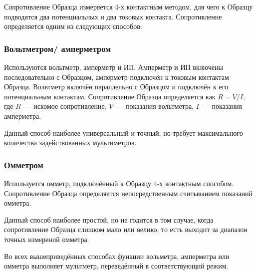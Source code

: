 \label{sec_r_measures}

Сопротивление Образца измеряется 4-х контактным методом, для чего к Образцу подводятся два потенциальных и два токовых контакта. Сопротивление определяется одним из следующих способов:

\subsubsection{Вольтметром/ амперметром}

Используются вольтметр, амперметр и ИП. Амперметр и ИП включены последовательно с Образцом, амперметр подключён к токовым контактам Образца. Вольтметр включён параллельно с Образцом и подключён к его потенциальным контактам. Сопротивление Образца определяется как $R = V/I$, где $R$~--- искомое сопротивление, $V$~--- показания вольтметра, $I$~--- показания амперметра.

Данный способ наиболее универсальный и точный, но требует максимального количества задействованных мультиметров.

\subsubsection{Омметром}

Используется омметр, подключённый к Образцу 4-х контактным способом. Сопротивление Образца определяется непосредственным считыванием показаний омметра.

Данный способ наиболее простой, но не годится в том случае, когда сопротивление Образца слишком мало или велико, то есть выходит за диапазон точных измерений омметра.

\bigskip 

Во всех вышеприведённых способах функции вольметра, амперметра или омметра выполняет мультметр, переведённый в соответствующий режим.
